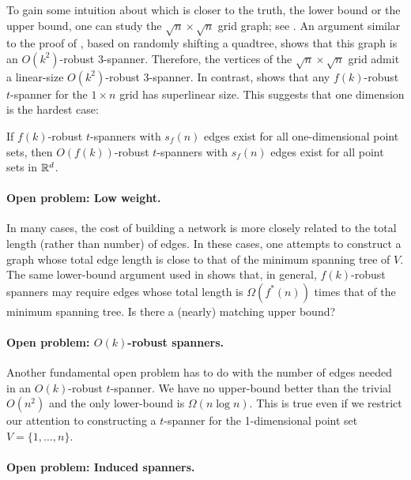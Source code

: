 \documentclass{patmorin}
\begin{document}
To gain some intuition about which is closer to the truth, the lower
bound or the upper bound, one can study the $\sqrt{n}\times\sqrt{n}$
grid graph; see .  An argument similar to the proof of
, based on randomly shifting a quadtree, shows that
this graph is an $O(k^2)$-robust $3$-spanner.  Therefore, the vertices
of the $\sqrt{n}\times\sqrt{n}$ grid admit a linear-size $O(k^2)$-robust
3-spanner.  In contrast,  shows that any
$f(k)$-robust $t$-spanner for the $1\times n$ grid has superlinear size.
This suggests that one dimension is the hardest case:

\begin{conj}
If $f(k)$-robust $t$-spanners with $s_f(n)$ edges exist for all one-dimensional point sets, then $O(f(k))$-robust $t$-spanners with $s_f(n)$ edges exist for all point sets in $\mathbb{R}^d$.
\end{conj}


\paragraph{Open problem: Low weight.}

In many cases, the cost of building a network is more closely related to
the total length (rather than number) of edges.  In these cases, one
attempts to construct a graph whose total edge length is close to that
of the minimum spanning tree of $V$. The same lower-bound argument used
in  shows that, in general, $f(k)$-robust
spanners may require edges whose total length is $\Omega(f^*(n))$ times
that of the minimum spanning tree.  Is there a (nearly) matching upper bound?

\paragraph{Open problem: $O(k)$-robust spanners.}

Another fundamental open problem has to do with the number of edges needed
in an $O(k)$-robust $t$-spanner.  We have no upper-bound better than the
trivial $O(n^2)$ and the only lower-bound is $\Omega(n\log n)$.  This is
true even if we restrict our attention to constructing a $t$-spanner
for the 1-dimensional point set $V=\{1,\ldots,n\}$.

\paragraph{Open problem: Induced spanners.}
\end{document}
